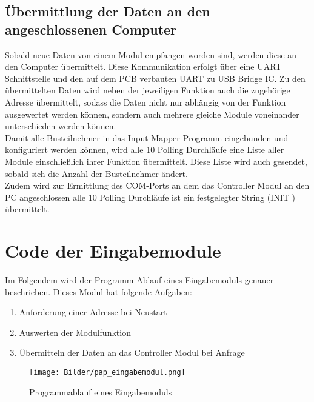 

\subsection{Übermittlung der Daten an den angeschlossenen Computer}
Sobald neue Daten von einem Modul empfangen worden sind, werden diese an den Computer übermittelt. Diese Kommunikation erfolgt über eine UART Schnittstelle und den auf dem PCB verbauten UART zu USB Bridge IC. Zu den übermittelten Daten wird neben der jeweiligen Funktion auch die zugehörige Adresse übermittelt, sodass die Daten nicht nur abhängig von der Funktion ausgewertet werden können, sondern auch mehrere gleiche Module voneinander unterschieden werden können.\\
Damit alle Busteilnehmer in das Input-Mapper Programm eingebunden und konfiguriert werden können, wird alle 10 Polling Durchläufe eine Liste aller Module einschließlich ihrer Funktion übermittelt. Diese Liste wird auch gesendet, sobald sich die Anzahl der Busteilnehmer ändert.\\
Zudem wird zur Ermittlung des COM-Ports an dem das Controller Modul an den PC angeschlossen alle 10 Polling Durchläufe ist ein festgelegter String (\glqq INIT
\grqq) übermittelt.


\section{Code der Eingabemodule}
\label{Code der Eingabemodule}
Im Folgendem wird der Programm-Ablauf eines Eingabemoduls genauer beschrieben. Dieses Modul hat folgende Aufgaben:
\begin{enumerate}
    \item Anforderung einer Adresse bei Neustart
    \item Auswerten der Modulfunktion
    \item Übermitteln der Daten an das Controller Modul bei Anfrage
\end{enumerate}

\begin{figure}[H]
	\centering    
	\texttt{[image: Bilder/pap\_eingabemodul.png]}
	\caption{Programmablauf eines Eingabemoduls}
	\label{Programm_Eingabemodul}
\end{figure}


